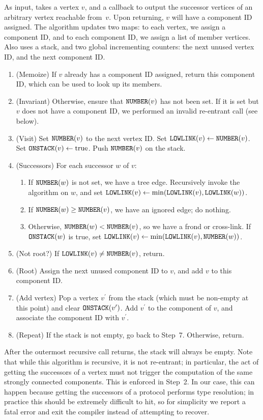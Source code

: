 \documentclass[../generics]{subfiles}
\begin{document}
\begin{algorithm}\label{tarjan}
As input, takes a vertex $v$, and a callback to output the successor vertices of an arbitrary vertex reachable from~$v$. Upon returning, $v$ will have a component ID assigned. The algorithm updates two maps: to each vertex, we assign a component ID, and to each component ID, we assign a list of member vertices. Also uses a stack, and two global incrementing counters: the next unused vertex ID, and the next component ID.
\begin{enumerate}
\item (Memoize) If $v$ already has a component ID assigned, return this component ID, which can be used to look up its members.
\item (Invariant) Otherwise, ensure that $\texttt{NUMBER}(v)$ has not been set. If it is set but $v$ does not have a component ID, we performed an invalid re-entrant call (see below).
\item (Visit) Set $\texttt{NUMBER}(v)$ to the next vertex ID. Set $\texttt{LOWLINK}(v)\leftarrow\texttt{NUMBER}(v)$. Set $\texttt{ONSTACK}(v)\leftarrow \textrm{true}$. Push $\texttt{NUMBER}(v)$ on the stack.
\item (Successors) For each successor $w$ of $v$:
\begin{enumerate}
\item If $\texttt{NUMBER}(w)$ is not set, we have a tree edge. Recursively invoke the algorithm on $w$, and set $\texttt{LOWLINK}(v)\leftarrow\min(\texttt{LOWLINK}(v), \texttt{LOWLINK}(w))$.
\item If $\texttt{NUMBER}(w)\geq\texttt{NUMBER}(v)$, we have an ignored edge; do nothing.
\item Otherwise, $\texttt{NUMBER}(w)<\texttt{NUMBER}(v)$, so we have a frond or cross-link. If $\texttt{ONSTACK}(w)$ is true, set $\texttt{LOWLINK}(v)\leftarrow\min(\texttt{LOWLINK}(v),\texttt{NUMBER}(w))$.
\end{enumerate}
\item (Not root?) If $\texttt{LOWLINK}(v)\neq\texttt{NUMBER}(v)$, return.
\item (Root) Assign the next unused component ID to $v$, and add $v$ to this component ID.
\item (Add vertex) Pop a vertex $v^\prime$ from the stack (which must be non-empty at this point) and clear $\texttt{ONSTACK}(v^\prime)$. Add $v^\prime$ to the component of $v$, and associate the component ID with $v^\prime$.
\item (Repeat) If the stack is not empty, go back to Step~7. Otherwise, return.
\end{enumerate}
\end{algorithm}
After the outermost recursive call returns, the stack will always be empty. Note that while this algorithm is recursive, it is not re-entrant; in particular, the act of getting the successors of a vertex must not trigger the computation of the same strongly connected components. This is enforced in Step~2. In our case, this can happen because getting the successors of a protocol performs type resolution; in practice this should be extremely difficult to hit, so for simplicity we report a fatal error and exit the compiler instead of attempting to recover.
\end{document}
